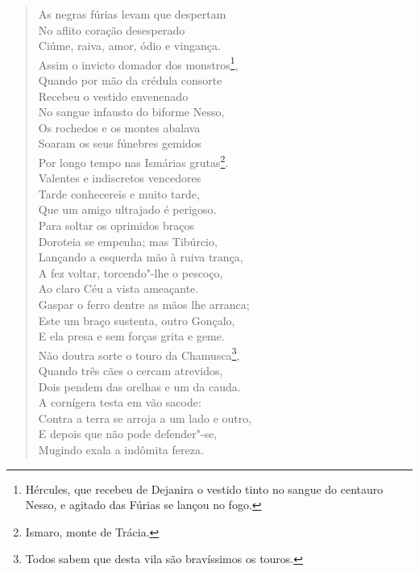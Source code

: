 \begin{verse}
As negras fúrias levam que despertam\\
No aflito coração desesperado\\
Ciúme, raiva, amor, ódio e vingança.\\
Assim o invicto domador dos monstros\footnote{ Hércules, que recebeu
de Dejanira o vestido tinto no sangue do centauro Nesso, e agitado das Fúrias se
lançou no fogo.},\\
Quando por mão da crédula consorte\\
Recebeu o vestido envenenado\\
No sangue infausto do biforme Nesso,\\
Os rochedos e os montes abalava\\ 
Soaram os seus fúnebres gemidos\\
Por longo tempo nas Ismárias grutas\footnote{ Ismaro, monte de Trácia.}.\\
Valentes e indiscretos vencedores\\
Tarde conhecereis e muito tarde,\\
Que um amigo ultrajado é perigoso. \\[10pt]


Para soltar os oprimidos braços\\
Doroteia se empenha; mas Tibúrcio,\\
Lançando a esquerda mão à ruiva trança,\\
A fez voltar, torcendo"-lhe o pescoço,\\
Ao claro Céu a vista ameaçante.\\
Gaspar o ferro dentre as mãos lhe arranca;\\
Este um braço sustenta, outro Gonçalo,\\
E ela presa e sem forças grita e geme.\\
Não doutra sorte o touro da Chamusca\footnote{ Todos sabem que desta
vila são bravíssimos os touros.},\\
Quando três cães o cercam atrevidos,\\
Dois pendem das orelhas e um da cauda.\\
A cornígera testa em vão sacode:\\
Contra a terra se arroja a um lado e outro,\\
E depois que não pode defender"-se,\\
Mugindo exala a indômita fereza. \\[10pt]
\end{verse}

\pagebreak
\paginabranca


